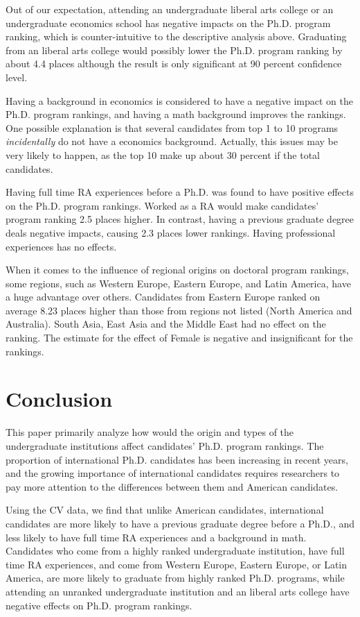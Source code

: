 \documentclass[12pt]{article}
\begin{document}
Out of our expectation, attending an undergraduate liberal arts college or an undergraduate economics school has negative impacts on the Ph.D. program ranking, which is counter-intuitive to the descriptive analysis above. Graduating from an liberal arts college would possibly lower the Ph.D. program ranking by about 4.4 places although the result is only significant at 90 percent confidence level.

Having a background in economics is considered to have a negative impact on the Ph.D. program rankings, and having a math background improves the rankings. One possible explanation is that several candidates from top 1 to 10 programs \textit{incidentally} do not have a economics background. Actually, this issues may be very likely to happen, as the top 10 make up about 30 percent if the total candidates.

Having full time RA experiences before a Ph.D. was found to have positive effects on the Ph.D. program rankings. Worked as a RA would make candidates' program ranking 2.5 places higher. In contrast, having a previous graduate degree deals negative impacts, causing 2.3 places lower rankings. Having professional experiences has no effects. 

When it comes to the influence of regional origins on doctoral program rankings, some regions, such as Western Europe, Eastern Europe, and Latin America, have a huge advantage over others. Candidates from Eastern Europe ranked on average 8.23 places higher than those from regions not listed (North America and Australia). South Asia, East Asia and the Middle East had no effect on the ranking. The estimate for the effect of Female is negative and insignificant for the rankings.




\clearpage
\section{Conclusion \label{sec: conclusion}
}
This paper primarily analyze how would the origin and types of the undergraduate institutions affect candidates' Ph.D. program rankings. The proportion of international Ph.D. candidates has been increasing in recent years, and the growing importance of international candidates requires researchers to pay more attention to the differences between them and American candidates. 

Using the CV data, we find that unlike American candidates, international candidates are more likely to have a previous graduate degree before a Ph.D., and less likely to have full time RA experiences and a background in math. Candidates who come from a highly ranked undergraduate institution, have full time RA experiences, and come from Western Europe, Eastern Europe, or Latin America, are more likely to graduate from highly ranked Ph.D. programs, while attending an unranked undergraduate institution and an liberal arts college have negative effects on Ph.D. program rankings.
\end{document}
